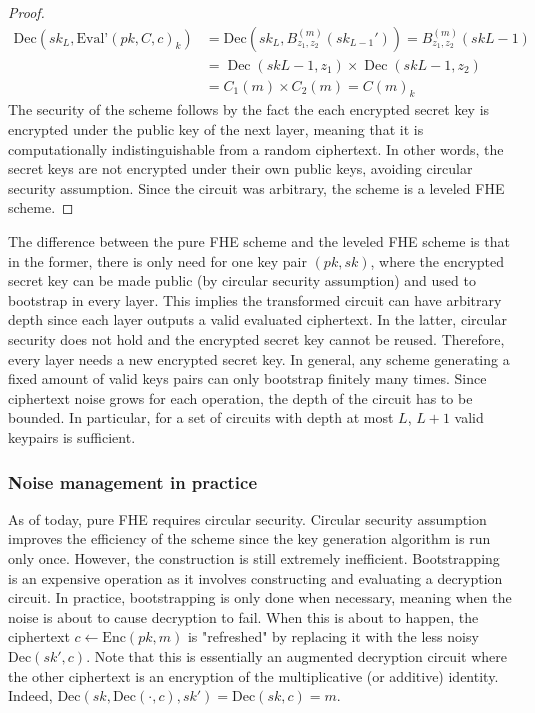 \begin{proof}
\begin{equation*}
    \begin{aligned}
    \text{Dec}(sk_L, \text{Eval'}(pk, C, c)_k) &= \text{Dec}(sk_L, B_{z_1,z_2}^{(m)}(sk_{L-1}')) = B_{z_1,z_2}^{(m)}(sk{L-1}) \\
    &= \operatorname{Dec}(sk{L-1}, z_1) \times \operatorname{Dec}(sk{L-1}, z_2) \\
    &= C_1(m) \times C_2(m) = C(m)_k
    \end{aligned}
\end{equation*}
The security of the scheme follows by the fact the each encrypted secret key is encrypted under the public key of the next layer, meaning that it is computationally indistinguishable from a random ciphertext. In other words, the secret keys are not encrypted under their own public keys, avoiding circular security assumption. Since the circuit was arbitrary, the scheme is a leveled FHE scheme.
\end{proof}

The difference between the pure FHE scheme and the leveled FHE scheme is that in the former, there is only need for one key pair $(pk,sk)$, where the encrypted secret key can be made public (by circular security assumption) and used to bootstrap in every layer. This implies the transformed circuit can have arbitrary depth since each layer outputs a valid evaluated ciphertext. In the latter, circular security does not hold and the encrypted secret key cannot be reused. Therefore, every layer needs a new encrypted secret key. In general, any scheme generating a fixed amount of valid keys pairs can only bootstrap finitely many times. Since ciphertext noise grows for each operation, the depth of the circuit has to be bounded. In particular, for a set of circuits with depth at most $L$, $L+1$ valid keypairs is sufficient.

\subsubsection*{Noise management in practice}
As of today, pure FHE requires circular security. Circular security assumption improves the efficiency of the scheme since the key generation algorithm is run only once. However, the construction is still extremely inefficient. Bootstrapping is an expensive operation as it involves constructing and evaluating a decryption circuit. In practice, bootstrapping is only done when necessary, meaning when the noise is about to cause decryption to fail. When this is about to happen, the ciphertext $c \leftarrow \text{Enc}(pk, m)$ is "refreshed" by replacing it with the less noisy $\text{Dec}(sk',c)$. Note that this is essentially an augmented decryption circuit where the other ciphertext is an encryption of the multiplicative (or additive) identity. Indeed, $\text{Dec}(sk,\text{Dec}(\cdot,c), sk') = \text{Dec}(sk,c) = m$.